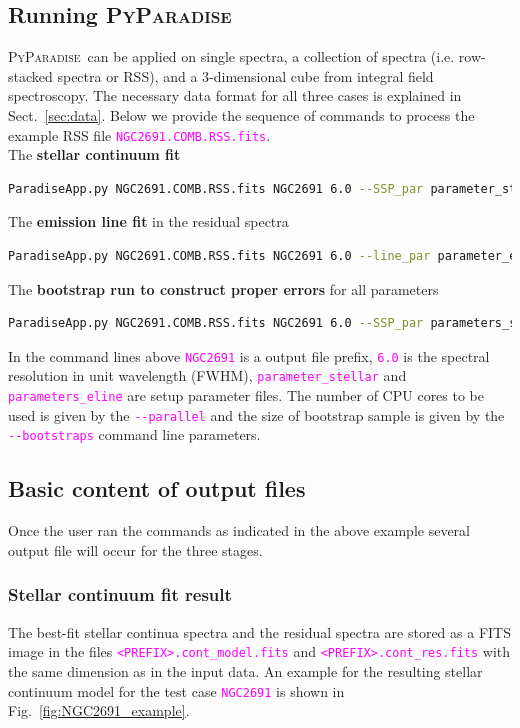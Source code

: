 \documentclass[usenatbib,usegraphicx,useAMS,onecolumn]{mn2e}
\newcommand{\codeline}[1]{\lstinline|#1|}
\newcommand{\fname}[1]{\textcolor{magenta}{\codeline{#1}}}
\newcommand{\PyPar}{\mbox{\textsc{PyParadise}}}
\begin{document}
\subsection{Running \PyPar}
\PyPar\ can be applied on single spectra, a collection of spectra (i.e. row-stacked spectra or RSS), and a 3-dimensional cube from integral field spectroscopy. The necessary data format for all three cases is explained in Sect.~\ref{sec:data}. Below we provide the sequence of commands to process the example RSS file \fname{NGC2691.COMB.RSS.fits}.\\
The \textbf{stellar continuum fit}
\begin{lstlisting}[language=sh]
    ParadiseApp.py NGC2691.COMB.RSS.fits NGC2691 6.0 --SSP_par parameter_stellar --parallel 1
\end{lstlisting}

\noindent The \textbf{emission line fit} in the residual spectra
\begin{lstlisting}[language=sh]
    ParadiseApp.py NGC2691.COMB.RSS.fits NGC2691 6.0 --line_par parameter_eline --parallel 1
\end{lstlisting}

\noindent The \textbf{bootstrap run to construct proper errors} for all parameters
\begin{lstlisting}[language=sh]
    ParadiseApp.py NGC2691.COMB.RSS.fits NGC2691 6.0 --SSP_par parameters_stellar --line_par parameter_eline --bootstraps 100 --parallel 4
\end{lstlisting}

\noindent In the command lines above \fname{NGC2691} is a output file prefix, \fname{6.0} is the spectral resolution in unit wavelength (FWHM), \fname{parameter_stellar} and \fname{parameters_eline} are setup parameter files. The number of CPU cores to be used is given by the \fname{--parallel}  and the size of bootstrap sample is given by the \fname{--bootstraps} command line parameters.

\subsection{Basic content of output files}
Once the user ran the commands as indicated in the above example several output file will occur for the three stages. 
\subsubsection{Stellar continuum fit result}
The best-fit stellar continua spectra and the residual spectra are stored as a FITS image in the files \fname{<PREFIX>.cont_model.fits} and \fname{<PREFIX>.cont_res.fits} with the same dimension as in the input data. An example for the resulting stellar continuum model for the test case \fname{NGC2691} is shown in Fig.~\ref{fig:NGC2691_example}. 
\end{document}
